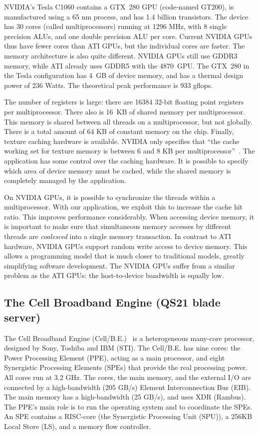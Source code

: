 \documentclass{article}
\begin{document}
NVIDIA's Tesla C1060 contains a GTX~280 GPU (code-named GT200), is
manufactured using a 65 nm process, and has 1.4 billion
transistors. The device has 30 cores (called multiprocessors) running
at 1296 MHz, with 8 single precision ALUs, and one double precision
ALU per core.  Current NVIDIA GPUs thus have fewer cores than ATI
GPUs, but the individual cores are faster. The memory architecture is
also quite different. NVIDIA GPUs still use GDDR3 memory, while ATI
already uses GDDR5 with the 4870~GPU. The GTX~280 in the Tesla
configuration has 4~GB of device memory, and has a thermal design
power of 236 Watts.  The theoretical peak performance is 933 gflops.

The number of registers is large: there are 16384 32-bit floating
point registers per multiprocessor. There also is 16~KB of shared memory per multiprocessor. 
This memory is shared between all threads on a multiprocessor, but not globally.
There is a total amount of 64 KB of constant memory on the chip.  
Finally, texture caching hardware is available. 
NVIDIA only specifies that ``the cache working set for texture memory
is between 6 and 8 KB per multiprocessor''~\cite{cuda-manual}.
The application has some control over the caching
hardware.  It is possible to specify which area of device
memory must be cached, while the shared memory is completely
managed by the application.  

On NVIDIA GPUs, it is possible to synchronize the threads within a multiprocessor.
With our application, we exploit this to increase the cache hit
ratio. This improves performance considerably. 
When accessing device memory, it is important to make sure that simultaneous
memory accesses by different threads are \emph{coalesced} into a
single memory transaction.  
In contrast to ATI hardware, NVIDIA GPUs support random write access
to device memory. This allows a programming model that is much closer
to traditional models, greatly simplifying software development.
The NVIDIA GPUs suffer from a similar 
problem as the ATI GPUs: the host-to-device bandwidth is equally
low.



\subsection{The Cell Broadband Engine (QS21 blade server)}

The Cell Broadband Engine (\mbox{Cell/B.E.})~\cite{cell} is a heterogeneous many-core
processor, designed by Sony, Toshiba and IBM (STI). 
The \mbox{Cell/B.E.} has nine cores: the Power Processing Element
(PPE), acting as a main processor, and eight Synergistic Processing
Elements (SPEs) that provide the real processing power. All cores run at 3.2 GHz.
The cores, the main memory, and the external I/O are connected by a
high-bandwidth (205 GB/s) Element Interconnection Bus (EIB).
The main memory has a high-bandwidth (25 GB/s), and uses XDR (Rambus).
The PPE's main role is
to run the operating system and to coordinate the SPEs.
An SPE contains a RISC-core (the Synergistic Processing Unit (SPU)), 
a 256KB Local Store (LS), and a memory flow controller. 
\end{document}
